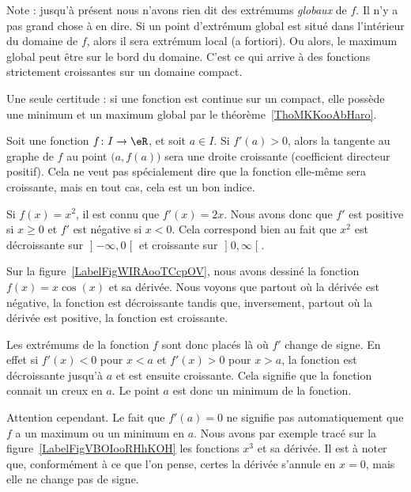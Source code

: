 Note : jusqu'à présent nous n'avons rien dit des extrémums \emph{globaux} de \( f\). Il n'y a pas grand chose à en dire. Si un point d'extrémum global est situé dans l'intérieur du domaine de \( f\), alors il sera extrémum local (a fortiori). Ou alors, le maximum global peut être sur le bord du domaine. C'est ce qui arrive à des fonctions strictement croissantes sur un domaine compact.

Une seule certitude : si une fonction est continue sur un compact, elle possède une minimum et un maximum global par le théorème~\ref{ThoMKKooAbHaro}.

Soit une fonction \( f\colon I\to \eR\), et soit \( a\in I\). Si \( f'(a)>0\), alors la tangente au graphe de \( f\) au point \( \big( a,f(a) \big)\) sera une droite croissante (coefficient directeur positif). Cela ne veut pas spécialement dire que la fonction elle-même sera croissante, mais en tout cas, cela est un bon indice.

\begin{example}
	Si \( f(x)=x^2\), il est connu que \( f'(x)=2x\). Nous avons donc que \( f'\) est positive si \( x\geq 0\) et \( f'\) est négative si \( x<0\). Cela correspond bien au fait que \( x^2\) est décroissante sur \( \mathopen] -\infty , 0 \mathclose[\) et croissante sur \( \mathopen] 0 , \infty \mathclose[\).
\end{example}

Sur la figure~\ref{LabelFigWIRAooTCcpOV}, nous avons dessiné la fonction \( f(x)=x\cos(x)\) et sa dérivée. Nous voyons que partout où la dérivée est négative, la fonction est décroissante tandis que, inversement, partout où la dérivée est positive, la fonction est croissante.
\newcommand{\CaptionFigWIRAooTCcpOV}{La fonction \( f(x)=x\cos(x)\) en bleu et sa dérivée en rouge.}


Les extrémums de la fonction \( f\) sont donc placés là où \( f'\) change de signe. En effet si \( f'(x)<0\) pour \( x<a\) et \( f'(x)>0\) pour \( x>a\), la fonction est décroissante jusqu'à \( a\) et est ensuite croissante. Cela signifie que la fonction connait un creux en \( a\). Le point \( a\) est donc un minimum de la fonction.

Attention cependant. Le fait que \( f'(a)=0\) ne signifie pas automatiquement que \( f\) a un maximum ou un minimum en \( a\). Nous avons par exemple tracé sur la figure~\ref{LabelFigVBOIooRHhKOH} les fonctions \( x^3\) et sa dérivée. Il est à noter que, conformément à ce que l'on pense, certes la dérivée s'annule en \( x=0\), mais elle ne change pas de signe.

